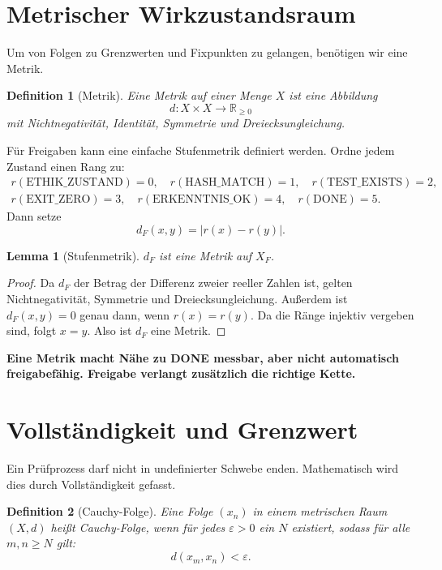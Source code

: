 \documentclass[11pt,a4paper,oneside]{scrartcl}
\theoremstyle{qikstyle}
\newtheorem{definition}{Definition}[section]
\newtheorem{lemma}[satz]{Lemma}
\newcommand{\DONE}{\mathrm{DONE}}
\newcommand{\HASH}{\mathrm{HASH\_MATCH}}
\newcommand{\TEST}{\mathrm{TEST\_EXISTS}}
\newcommand{\EXIT}{\mathrm{EXIT\_ZERO}}
\newcommand{\ERK}{\mathrm{ERKENNTNIS\_OK}}
\newcommand{\ETH}{\mathrm{ETHIK\_ZUSTAND}}
\newcommand{\Real}{\mathbb{R}}
\newcommand{\eps}{\varepsilon}
\newenvironment{merksatz}{\begin{center}\begin{minipage}{0.92\linewidth}\sffamily\bfseries}{\end{minipage}\end{center}}
\begin{document}
\section{Metrischer Wirkzustandsraum}

Um von Folgen zu Grenzwerten und Fixpunkten zu gelangen, benötigen wir eine Metrik.

\begin{definition}[Metrik]
Eine Metrik auf einer Menge \(X\) ist eine Abbildung
\[
d:X\times X\to \Real_{\geq 0}
\]
mit Nichtnegativität, Identität, Symmetrie und Dreiecksungleichung.
\end{definition}

Für Freigaben kann eine einfache Stufenmetrik definiert werden. Ordne jedem Zustand einen Rang zu:
\[
\begin{gathered}
r(\ETH)=0,\quad r(\HASH)=1,\quad r(\TEST)=2,\\
r(\EXIT)=3,\quad r(\ERK)=4,\quad r(\DONE)=5.
\end{gathered}
\]
Dann setze
\[
d_F(x,y)=|r(x)-r(y)|.
\]

\begin{lemma}[Stufenmetrik]
\(d_F\) ist eine Metrik auf \(X_F\).
\end{lemma}

\begin{proof}
Da \(d_F\) der Betrag der Differenz zweier reeller Zahlen ist, gelten Nichtnegativität, Symmetrie und Dreiecksungleichung. Außerdem ist \(d_F(x,y)=0\) genau dann, wenn \(r(x)=r(y)\). Da die Ränge injektiv vergeben sind, folgt \(x=y\). Also ist \(d_F\) eine Metrik.
\end{proof}

\begin{merksatz}
Eine Metrik macht Nähe zu DONE messbar, aber nicht automatisch freigabefähig. Freigabe verlangt zusätzlich die richtige Kette.
\end{merksatz}
\newpage

\section{Vollständigkeit und Grenzwert}

Ein Prüfprozess darf nicht in undefinierter Schwebe enden. Mathematisch wird dies durch Vollständigkeit gefasst.

\begin{definition}[Cauchy-Folge]
Eine Folge \((x_n)\) in einem metrischen Raum \((X,d)\) heißt Cauchy-Folge, wenn für jedes \(\eps>0\) ein \(N\) existiert, sodass für alle \(m,n\geq N\) gilt:
\[
d(x_m,x_n)<\eps.
\]
\end{definition}
\end{document}
